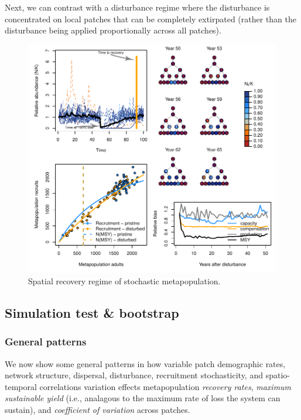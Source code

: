 \documentclass[]{article}
\begin{document}
Next, we can contrast with a disturbance regime where the disturbance is
concentrated on local patches that can be completely extirpated (rather
than the disturbance being applied proportionally across all patches).

\begin{figure}[H]

{\centering \includegraphics{Managing_for_ecological_surprises_in_metapopulations_makeHTML_files/figure-latex/example results4-1} 

}

\caption{Spatial recovery regime of stochastic metapopulation.}\label{fig:example results4}
\end{figure}

\hypertarget{simulation-test-bootstrap}{%
\subsection{Simulation test \&
bootstrap}\label{simulation-test-bootstrap}}

\hypertarget{general-patterns}{%
\subsubsection{General patterns}\label{general-patterns}}

We now show some general patterns in how variable patch demographic
rates, network structure, dispersal, disturbance, recruitment
stochasticity, and spatio-temporal correlations variation effects
metapopulation \emph{recovery rates}, \emph{maximum sustainable yield}
(i.e., analagous to the maximum rate of loss the system can sustain),
and \emph{coefficient of variation} across patches.
\end{document}
